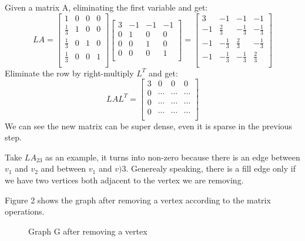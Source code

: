 \documentclass{article}
\begin{document}
	Given a matrix A, eliminating the first variable and get:
	$$LA =
	\begin{bmatrix}
	1 & 0 & 0 & 0 \\
	\frac{1}{3} & 1 & 0 & 0 \\
	\frac{1}{3} & 0 & 1 & 0 \\
	\frac{1}{3} & 0 & 0 & 1 \\
	\end{bmatrix}
	\begin{bmatrix}
	3 & -1 & -1 & -1 \\
	0& 1 & 0 & 0 \\
	0 & 0 & 1 & 0 \\
	0 & 0 & 0 & 1 \\
	\end{bmatrix}
	=
	\begin{bmatrix}
	3 & -1 & -1 & -1 \\
	-1 & \frac{2}{3} & -\frac{1}{3} & -\frac{1}{3} \\
	-1 & -\frac{1}{3} & \frac{2}{3}& -\frac{1}{3} \\
	-1 & -\frac{1}{3} & -\frac{1}{3} & \frac{2}{3} \\
	\end{bmatrix}
	$$
	Eliminate the row by right-multiply $L^T$ and get:
	$$LAL^T = \begin{bmatrix}
	3 & 0 & 0 & 0 \\
	0 & \cdots & \cdots & \cdots \\
	0 & \cdots & \cdots & \cdots \\
	0 & \cdots & \cdots & \cdots \\
	\end{bmatrix}$$
	We can see the new matrix can be super dense, even it is sparse in the previous step. 
	
	Take $LA_{23}$ as an example, it turns into non-zero because there is an edge between $v_1$ and $v_2$ and between $v_1$ and $v)3$. Generealy speaking, there is a fill edge only if we have two vertices both adjacent to the vertex we are removing.
	
	Figure 2 shows the graph after removing a vertex according to the matrix operations.
	
    \begin{figure}[h!]
    	\begin{center}
    	\end{center}
    	\caption{Graph G after removing a vertex}
    \end{figure}
    
\end{document}
